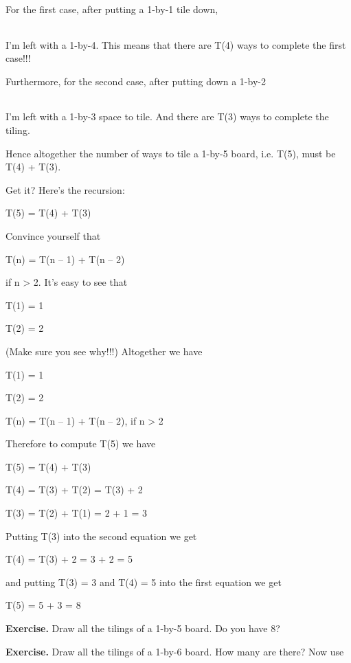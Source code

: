 \documentclass[
]{article}
\begin{document}
For the first case, after putting a 1-by-1 tile down,

\begin{longtable}[]{@{}lllll@{}}
\toprule
\endhead
& & & &\tabularnewline
\bottomrule
\end{longtable}

I'm left with a 1-by-4. This means that there are T(4) ways to complete
the first case!!!

Furthermore, for the second case, after putting down a 1-by-2

\begin{longtable}[]{@{}lllll@{}}
\toprule
\endhead
& & & &\tabularnewline
\bottomrule
\end{longtable}

I'm left with a 1-by-3 space to tile. And there are T(3) ways to
complete the tiling.

Hence altogether the number of ways to tile a 1-by-5 board, i.e. T(5),
must be T(4) + T(3).

Get it? Here's the recursion:

T(5) = T(4) + T(3)

Convince yourself that

T(n) = T(n -- 1) + T(n -- 2)

if n \textgreater{} 2. It's easy to see that

T(1) = 1

T(2) = 2

(Make sure you see why!!!) Altogether we have

T(1) = 1

T(2) = 2

T(n) = T(n -- 1) + T(n -- 2), if n \textgreater{} 2

Therefore to compute T(5) we have

T(5) = T(4) + T(3)

T(4) = T(3) + T(2) = T(3) + 2

T(3) = T(2) + T(1) = 2 + 1 = 3

Putting T(3) into the second equation we get

T(4) = T(3) + 2 = 3 + 2 = 5

and putting T(3) = 3 and T(4) = 5 into the first equation we get

T(5) = 5 + 3 = 8

\textbf{Exercise.} Draw all the tilings of a 1-by-5 board. Do you have
8?

\textbf{Exercise.} Draw all the tilings of a 1-by-6 board. How many are
there? Now use
\end{document}
